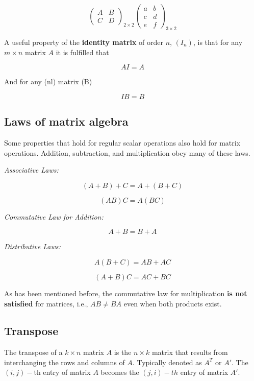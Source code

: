 \documentclass[11pt]{article}
\begin{document}
\[
\begin{pmatrix} A & B \\ C & D \end{pmatrix}_{2\times 2} \begin{pmatrix} a & b \\ c & d \\ e & f \end{pmatrix}_{3\times 2}
\]

A useful property of the \textbf{identity matrix} of order \(n\),
\((I_n)\), is that for any \(m\times n\) matrix \(A\) it is fulfilled
that

\[
AI = A
\]

And for any (n\times l) matrix (B)

\[
IB = B
\]

\hypertarget{laws-of-matrix-algebra}{%
\subsection{Laws of matrix algebra}\label{laws-of-matrix-algebra}}

Some properties that hold for regular scalar operations also hold for
matrix operations. Addition, subtraction, and multiplication obey many
of these laws.

\emph{Associative Laws:}

\[
(A + B) + C = A + (B + C)
\]

\[
(AB)C = A(BC)
\]

\emph{Commutative Law for Addition:}

\[
A + B = B + A
\]

\emph{Distributive Laws:}

\[
A(B + C) = AB + AC
\]

\[
(A + B)C = AC + BC
\]

As has been mentioned before, the commutative law for multiplication
\textbf{is not satisfied} for matrices, i.e., \(AB \neq BA\) even when
both products exist.

\hypertarget{transpose}{%
\subsection{Transpose}\label{transpose}}

The transpose of a \(k\times n\) matrix \(A\) is the \(n\times k\)
matrix that results from interchanging the rows and columns of \(A\).
Typically denoted as \(A^T\) or \(A'\). The \((i, j)-\)th entry of
matrix \(A\) becomes the \((j, i)-th\) entry of matrix \(A'\).
\end{document}
